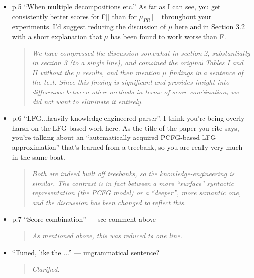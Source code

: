 \documentclass[letterpaper,12pt]{article}
\newenvironment{response}
{\begin{quotation} \it}
  {\end{quotation}}
\begin{document}
\begin{itemize}
\item p.5 ``When multiple decompositions etc.'' As far as I can see, you
  get consistently better scores for F[] than for $\mu_{PR}[]$
  throughout your experiments.  I'd suggest reducing the discussion of
  $\mu$ here and in Section 3.2 with a short explanation that $\mu$
  has been found to work worse than F.
  \begin{response}
  We have compressed the discussion somewhat in section 2, substantially in section 3 (to a single line), and combined the original Tables I and II without the $\mu$ results, and then mention $\mu$ findings in a sentence of the text. Since
this finding is significant and provides insight into differences between other methods in terms of score combination, we did not want to eliminate it entirely.
  \end{response}

\item  p.6 ``LFG...heavily knowledge-engineered parser''. I think you're
  being overly harsh on the LFG-based work here. As the title of the
  paper you cite says, you're talking about an ``automatically acquired
  PCFG-based LFG approximation'' that's learned from a treebank, so you
  are really very much in the same boat.
  \begin{response}
    Both are indeed built off treebanks, so the knowledge-engineering
    is similar. The contrast is in fact between a more ``surface''
    syntactic representation (the PCFG model) or a ``deeper'', more
    semantic one, and the discussion has been changed to reflect this.
  \end{response}

\item p.7 ``Score combination'' --- see comment above 
  \begin{response}
    As mentioned above, this was reduced to one line.
  \end{response}

\item ``Tuned, like the ...''  --- ungrammatical sentence?
  \begin{response}
    Clarified.
  \end{response}


\end{itemize}
\end{document}
